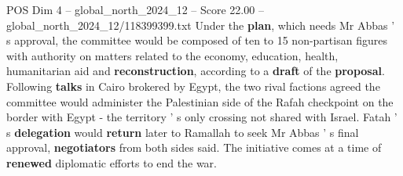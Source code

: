 \begin{textsample}{POS Dim 4 – global\_north\_2024\_12 – Score 22.00 – global\_north\_2024\_12/118399399.txt}
Under the \textbf{plan}, which needs Mr Abbas ' s approval, the committee would be composed of ten to 15 non-partisan figures with authority on matters related to the economy, education, health, humanitarian aid and \textbf{reconstruction}, according to a \textbf{draft} of the \textbf{proposal}.
Following \textbf{talks} in Cairo brokered by Egypt, the two rival factions agreed the committee would administer the Palestinian side of the Rafah checkpoint on the border with Egypt - the territory ' s only crossing not shared with Israel.
Fatah ' s \textbf{delegation} would \textbf{return} later to Ramallah to seek Mr Abbas ' s final approval, \textbf{negotiators} from both sides said.
The initiative comes at a time of \textbf{renewed} diplomatic efforts to end the war.

\end{textsample}
